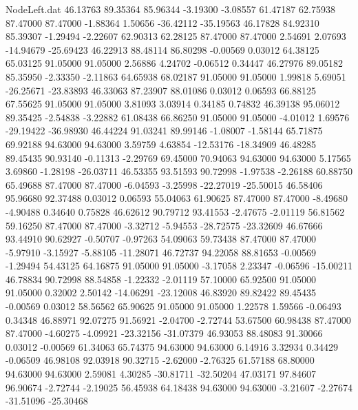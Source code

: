 \begin{filecontents}{NodeLeft.dat}
  46.13763   89.35364   85.96344    -3.19300   -3.08557   61.47187   62.75938   87.47000   87.47000   -1.88364    1.50656  -36.42112  -35.19563
  46.17828   84.92310   85.39307    -1.29494   -2.22607   62.90313   62.28125   87.47000   87.47000    2.54691    2.07693  -14.94679  -25.69423
  46.22913   88.48114   86.80298    -0.00569    0.03012   64.38125   65.03125   91.05000   91.05000    2.56886    4.24702   -0.06512    0.34447
  46.27976   89.05182   85.35950    -2.33350   -2.11863   64.65938   68.02187   91.05000   91.05000    1.99818    5.69051  -26.25671  -23.83893
  46.33063   87.23907   88.01086     0.03012    0.06593   66.88125   67.55625   91.05000   91.05000    3.81093    3.03914    0.34185    0.74832
  46.39138   95.06012   89.35425    -2.54838   -3.22882   61.08438   66.86250   91.05000   91.05000   -4.01012    1.69576  -29.19422  -36.98930
  46.44224   91.03241   89.99146    -1.08007   -1.58144   65.71875   69.92188   94.63000   94.63000    3.59759    4.63854  -12.53176  -18.34909
  46.48285   89.45435   90.93140    -0.11313   -2.29769   69.45000   70.94063   94.63000   94.63000    5.17565    3.69860   -1.28198  -26.03711
  46.53355   93.51593   90.72998    -1.97538   -2.26188   60.88750   65.49688   87.47000   87.47000   -6.04593   -3.25998  -22.27019  -25.50015
  46.58406   95.96680   92.37488     0.03012    0.06593   55.04063   61.90625   87.47000   87.47000   -8.49680   -4.90488    0.34640    0.75828
  46.62612   90.79712   93.41553    -2.47675   -2.01119   56.81562   59.16250   87.47000   87.47000   -3.32712   -5.94553  -28.72575  -23.32609
  46.67666   93.44910   90.62927    -0.50707   -0.97263   54.09063   59.73438   87.47000   87.47000   -5.97910   -3.15927   -5.88105  -11.28071
  46.72737   94.22058   88.81653    -0.00569   -1.29494   54.43125   64.16875   91.05000   91.05000   -3.17058    2.23347   -0.06596  -15.00211
  46.78834   90.72998   88.54858    -1.22332   -2.01119   57.10000   65.92500   91.05000   91.05000    0.32002    2.50142  -14.06291  -23.12008
  46.83920   89.82422   89.45435    -0.00569    0.03012   58.56562   65.90625   91.05000   91.05000    1.22578    1.59566   -0.06493    0.34348
  46.88971   92.07275   91.56921    -2.04700   -2.72744   53.67500   60.98438   87.47000   87.47000   -4.60275   -4.09921  -23.32156  -31.07379
  46.93053   88.48083   91.30066     0.03012   -0.00569   61.34063   65.74375   94.63000   94.63000    6.14916    3.32934    0.34429   -0.06509
  46.98108   92.03918   90.32715    -2.62000   -2.76325   61.57188   68.80000   94.63000   94.63000    2.59081    4.30285  -30.81711  -32.50204
  47.03171   97.84607   96.90674    -2.72744   -2.19025   56.45938   64.18438   94.63000   94.63000   -3.21607   -2.27674  -31.51096  -25.30468

\end{filecontents}
